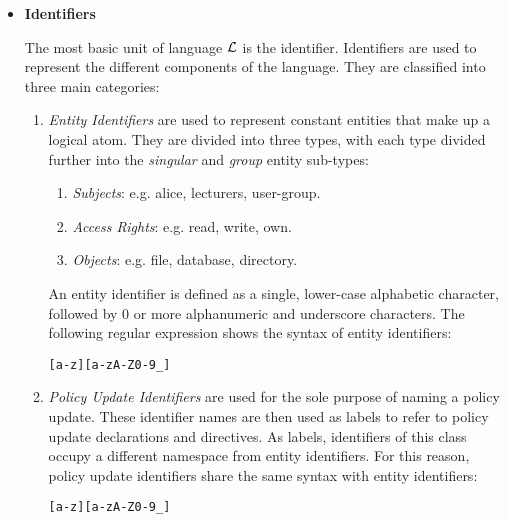 \documentclass[11pt]{report}
\newenvironment{vverbatim}
{
  \begin{alltt}
}
{
    \vspace{-\baselineskip}
  \end{alltt}
}
\begin{document}
        \begin{itemize}
          \item
            {\bf Identifiers}

            The most basic unit of language $\cal{L}$ is the identifier.
            Identifiers are used to represent the different components of
            the language. They are classified into three main categories:

            \begin{enumerate}
              \item
                {\em Entity Identifiers} are used to represent constant
                entities that make up a logical atom. They are divided into
                three types, with each type divided further into the
                {\em singular} and {\em group} entity sub-types:

                \begin{enumerate}
                  \item
                    {\em Subjects}: e.g. alice, lecturers, user-group.
                  \item
                    {\em Access Rights}: e.g. read, write, own.
                  \item
                    {\em Objects}: e.g. file, database, directory.
                \end{enumerate}

                An entity identifier is defined as a single, lower-case
                alphabetic character, followed by 0 or more alphanumeric and
                underscore characters. The following regular expression
                shows the syntax of entity identifiers:

                \begin{vverbatim}
  [a-z][a-zA-Z0-9\_]
                \end{vverbatim}

              \item
                {\em Policy Update Identifiers} are used for the sole
                purpose of naming a policy update. These identifier names
                are then used as labels to refer to policy update
                declarations and directives. As labels, identifiers of this
                class occupy a different namespace from entity identifiers.
                For this reason, policy update identifiers share the same
                syntax with entity identifiers:

                \begin{vverbatim}
  [a-z][a-zA-Z0-9\_]
                \end{vverbatim}


\end{enumerate}
\end{itemize}
\end{document}
